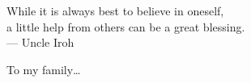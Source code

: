 \cleardoublepage
\thispagestyle{empty}


\vspace*{3cm}

\begin{raggedleft}
    While it is always best to believe in oneself,  \\
    a little help from others can be a great blessing.\\
     --- Uncle Iroh  \\
\end{raggedleft}

\vspace{4cm}

\begin{center}
    To my family\dots
\end{center}


